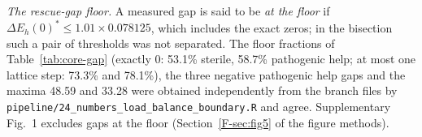 \documentclass[11pt]{article}
\newcommand{\gap}{\Delta E_h(0)^{*}}
\begin{document}
\begin{table}[H]
\centering
\caption{Rescue gaps of the bistable class per branch (percentages of the
measured gaps). All measured gaps run increasing in both arms.}
\label{tab:core-gap}
\end{table}

\emph{The rescue-gap floor.} A measured gap is said to be \emph{at the floor} if
$\gap \le 1.01\times0.078125$, which includes the exact zeros; in the bisection such a pair
of thresholds was not separated. The floor fractions of Table~\ref{tab:core-gap} (exactly 0:
53.1\% sterile, 58.7\% pathogenic help; at most one lattice step: 73.3\% and 78.1\%), the
three negative pathogenic help gaps and the maxima 48.59 and 33.28 were obtained
independently from the branch files by \texttt{pipeline/24\_numbers\_load\_balance\_boundary.R} and
agree. Supplementary Fig.~1 excludes gaps at the floor (Section~\ref{F-sec:fig5} of the figure methods).
\end{document}
